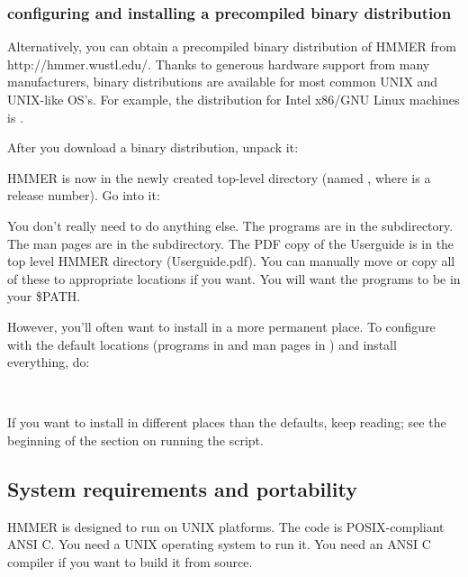 \subsubsection{configuring and installing a precompiled binary distribution}

Alternatively, you can obtain a precompiled binary distribution of
HMMER from 
{http://hmmer.wustl.edu/}. Thanks to generous hardware support from
many manufacturers, binary distributions are available for most common
UNIX and UNIX-like OS's. For example, the distribution for Intel
x86/GNU Linux machines is
.

After you download a binary distribution, unpack it:


HMMER is now in the newly created top-level directory (named
, where  is a release number). Go into
it:


You don't really need to do anything else. The programs are in the
 subdirectory. The man pages are in the
 subdirectory.  The PDF copy of the Userguide
is in the top level HMMER directory (Userguide.pdf).  You can manually
move or copy all of these to appropriate locations if you want. You
will want the programs to be in your \$PATH.

However, you'll often want to install in a more permanent place.  To
configure with the default locations (programs in
 and man pages in )
and install everything, do:

\\

If you want to install in different places than the defaults, keep
reading; see the beginning of the section on running the
 script.

\subsection{System requirements and portability}

HMMER is designed to run on UNIX platforms. The code is
POSIX-compliant ANSI C.  You need a UNIX operating system to run it.
You need an ANSI C compiler if you want to build it from source. 

